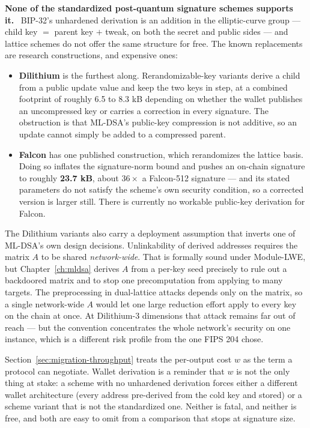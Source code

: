 \textbf{None of the standardized post-quantum signature schemes supports
it.}~\cite{blockstreamlattice2026} BIP-32's unhardened derivation is an addition
in the elliptic-curve group --- child key $=$ parent key $+$ tweak, on both the
secret and public sides --- and lattice schemes do not offer the same structure
for free. The known replacements are research constructions, and expensive ones:

\begin{itemize}
  \item \textbf{Dilithium} is the furthest along. Rerandomizable-key variants
        derive a child from a public update value and keep the two keys in
        step, at a combined footprint of roughly 6.5 to 8.3 kB depending on
        whether the wallet publishes an uncompressed key or carries a
        correction in every signature. The obstruction is that ML-DSA's
        public-key compression is not additive, so an update cannot simply be
        added to a compressed parent.
  \item \textbf{Falcon} has one published construction, which rerandomizes the
        lattice basis. Doing so inflates the signature-norm bound and pushes an
        on-chain signature to roughly \textbf{23.7 kB}, about $36\times$ a
        Falcon-512 signature --- and its stated parameters do not satisfy the
        scheme's own security condition, so a corrected version is larger
        still. There is currently no workable public-key derivation for Falcon.
\end{itemize}

The Dilithium variants also carry a deployment assumption that inverts one of
ML-DSA's own design decisions. Unlinkability of
derived addresses requires the matrix $A$ to be shared \emph{network-wide}. That
is formally sound under Module-LWE, but Chapter~\ref{ch:mldsa} derives $A$ from
a per-key seed precisely to rule out a backdoored matrix and to stop one
precomputation from applying to many targets. The preprocessing in dual-lattice
attacks depends only on the matrix, so a single network-wide $A$ would let one
large reduction effort apply to every key on the chain at once. At Dilithium-3
dimensions that attack remains far out of reach --- but the convention
concentrates the whole network's security on one instance, which is a different
risk profile from the one FIPS 204 chose.

\begin{remark}
Section~\ref{sec:migration-throughput} treats the per-output cost $w$ as the
term a protocol can negotiate. Wallet derivation is a reminder that $w$ is not
the only thing at stake: a scheme with no unhardened derivation forces either a
different wallet architecture (every address pre-derived from the cold key and
stored) or a scheme variant that is not the standardized one. Neither is fatal,
and neither is free, and both are easy to omit from a comparison that stops at
signature size.
\end{remark}


